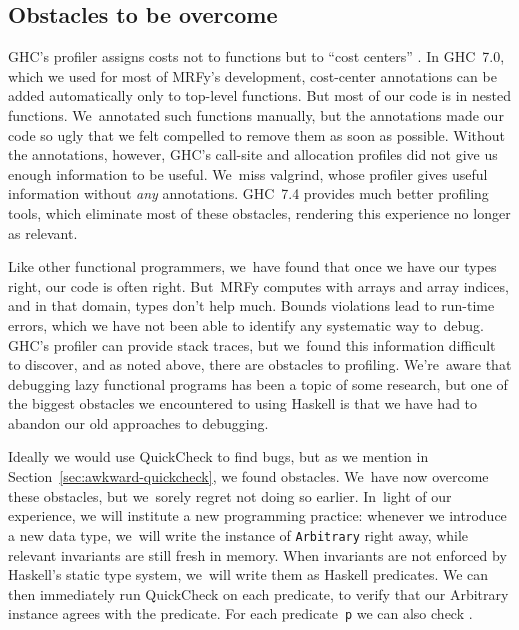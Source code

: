 \documentclass[preprint,nonatbib,blockstyle,times]{sigplanconf}
\newcommand\secref[1]{Section~\ref{sec:#1}}
\let\cite\citep
\begin{document}
\subsection{Obstacles to be overcome}

GHC's profiler assigns costs not to functions but to ``cost
centers'' \cite{sansom-pj}.
In GHC~7.0, which we used 
for most of MRFy's development, 
cost-center annotations can be added automatically only
to top-level 
functions.
But most of our code is in nested functions.
We~annotated such functions manually,
but the annotations
made our code so ugly that we felt compelled to
remove them as soon as possible.
Without the annotations, however, GHC's call-site and allocation
profiles did not give us enough information to be useful.
We~miss valgrind, whose profiler gives useful information
without \emph{any} annotations.
GHC~7.4 provides much
better profiling tools, which eliminate most of these obstacles,
rendering this experience no longer as relevant.

Like other functional programmers, we~have found that 
once we have our types right, our code is often right.
But~MRFy computes with arrays and array indices,
and in that domain, types don't help much.
Bounds violations lead to run-time errors, which we have not been able
to identify any systematic way to~debug.
GHC's profiler can provide stack traces, but we~found this information
difficult to discover, and as noted above,
there are obstacles to profiling.
We're~aware that debugging lazy functional programs has been a topic
of some research,
but one of the biggest obstacles we encountered to using Haskell is
that we have had to abandon our old approaches to debugging.

Ideally we would use QuickCheck to find bugs, but as we mention in
\secref{awkward-quickcheck}, we found obstacles.
We~have now overcome these obstacles, but
we~sorely regret not doing so earlier.
In~light of our experience, we will institute a new programming practice:
whenever we introduce a new data type,
we~will write the instance of
\texttt{Arbitrary} right away, while
relevant invariants are still fresh in memory.
When invariants are not enforced by Haskell's static type system,
we~will write them as Haskell predicates.
We can then immediately run QuickCheck on each predicate, to verify
that our Arbitrary instance agrees with the predicate.
For each predicate~\texttt{p} we can also check
.
\end{document}
